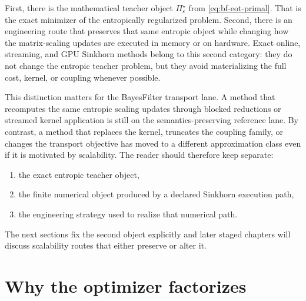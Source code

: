 First, there is the mathematical teacher object
\(\Pi_\varepsilon^\star\) from \eqref{eq:bf-eot-primal}.  That is the exact
minimizer of the entropically regularized problem.  Second, there is an
engineering route that preserves that same entropic object while changing how the
matrix-scaling updates are executed in memory or on hardware.  Exact online,
streaming, and GPU Sinkhorn methods belong to this second category: they do not
change the entropic teacher problem, but they avoid materializing the full cost,
kernel, or coupling whenever possible.

This distinction matters for the BayesFilter transport lane.  A method that
recomputes the same entropic scaling updates through blocked reductions or
streamed kernel application is still on the semantics-preserving reference lane.
By contrast, a method that replaces the kernel, truncates the coupling family, or
changes the transport objective has moved to a different approximation class even
if it is motivated by scalability.  The reader should therefore keep separate:
\begin{enumerate}[label=(\roman*)]
  \item the exact entropic teacher object,
  \item the finite numerical object produced by a declared Sinkhorn execution
    path,
  \item the engineering strategy used to realize that numerical path.
\end{enumerate}
The next sections fix the second object explicitly and later staged chapters will
discuss scalability routes that either preserve or alter it.

\section{Why the optimizer factorizes}
\label{sec:bf-eot-factorization}

